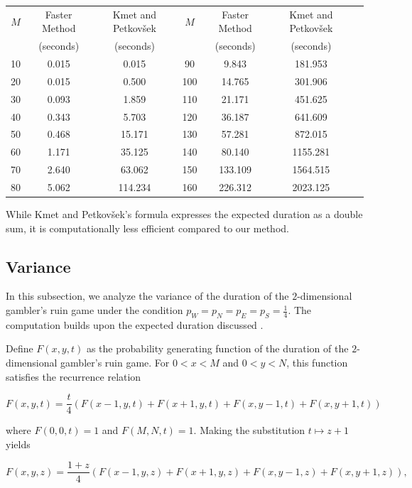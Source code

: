 \documentclass[reqno]{amsart}
\theoremstyle{definition}
\theoremstyle{definition}
\theoremstyle{remark}
\begin{document}
\begin{table}[H]
\centering
\begin{tabular}{|c|c|c|c|c|c|c|}
\hline
$M$ & Faster Method & Kmet and Petkov\v{s}ek & $M$ & Faster Method & Kmet and Petkov\v{s}ek \\
&(seconds) & (seconds)& &(seconds) & (seconds)\\
\hline
10 & 0.015 & 0.015  & 90 & 9.843 &  181.953 \\ \hline
20 & 0.015 &  0.500 & 100 & 14.765 & 301.906\\ \hline
30 & 0.093 & 1.859  & 110 & 21.171 & 451.625\\ \hline
40 & 0.343 & 5.703  & 120 & 36.187 &  641.609\\ \hline
50 & 0.468 & 15.171 & 130 & 57.281  & 872.015 \\ \hline
60 & 1.171 & 35.125 & 140 & 80.140  &  1155.281\\ \hline
70 & 2.640 & 63.062 & 150 & 133.109 &  1564.515\\ \hline
80 & 5.062 &  114.234 & 160 &  226.312& 2023.125\\ \hline
\end{tabular}
\end{table}

While Kmet and Petkov\v{s}ek's formula expresses the expected duration as a double sum, it is computationally less efficient compared to our method.


\subsection{Variance} In this subsection, we analyze the variance of the duration of the $2$-dimensional gambler's ruin game under the condition $p_W=p_N=p_E=p_S=\frac{1}{4}$. The computation builds upon the expected duration discussed .

Define $F(x,y,t)$ as the probability generating function of the duration of the $2$-dimensional gambler's ruin game. For $0<x<M$ and $0<y<N$, this function satisfies the recurrence relation

\begin{equation}\label{eq:2d variance eq in t}
    F(x,y,t)=\frac{t}{4}(F(x-1,y,t)+F(x+1,y,t)+F(x,y-1,t)+F(x,y+1,t))
\end{equation}

where $F(0,0,t)=1$ and $F(M,N,t)=1$. Making the substitution $t\mapsto z+1$ yields

\begin{equation}
    F(x,y,z)=\frac{1+z}{4}(F(x-1,y,z)+F(x+1,y,z)+F(x,y-1,z)+F(x,y+1,z)),
\end{equation}
\end{document}
